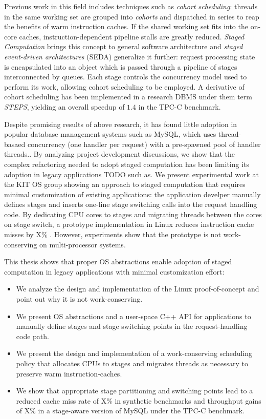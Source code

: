 \documentclass[12pt,a4paper]{book}
\begin{document}
Previous work in this field includes techniques such as \emph{cohort scheduling}:
threads in the same working set are grouped into \emph{cohorts} and dispatched in series to reap the benefits of warm instruction caches.
If the shared working set fits into the on-core caches, instruction-dependent pipeline stalls are greatly reduced.
\emph{Staged Computation} brings this concept to general software architecture and \emph{staged event-driven architectures} (SEDA) generalize it further:
request processing state is encapsulated into an object which is passed through a pipeline of stages interconnected by queues.
Each stage controls the concurrency model used to perform its work, allowing cohort scheduling to be employed.
A derivative of cohort scheduling has been implemented in a research DBMS under them term \emph{STEPS}, yielding an overall speedup of $1.4$ in the TPC-C benchmark.\cite{cohort,seda,steps,harizopoulos2005staged}

Despite promising results of above research, it has found little adoption in popular database management systems such as MySQL, which uses thread-basaed concurrency (one handler per request) with a pre-spawned pool of handler threads.\cite{mysqlThreading}.
By analyzing project development discussions, we show that the complex refactoring needed to adopt staged computation has been limiting its adoption in legacy applications TODO such as.
We present experimental work at the KIT OS group showing an approach to staged computation that requires minimal customization of existing applications:
the application develper manually defines stages and inserts one-line stage switching calls into the request handling code.
By dedicating CPU cores to stages and migrating threads between the cores on stage switch, a prototype implementation in Linux reduces instruction cache misses by X\% .
However, experiments show that the prototype is not work-conserving on multi-processor systems.

This thesis shows that proper OS abstractions enable adoption of staged computation in legacy applications with minimal customization effort:
\begin{itemize}
    \item We analyze the design and implementation of the Linux proof-of-concept and point out why it is not work-conserving.
    \item We present OS abstractions and a user-space C++ API for applications to manually define stages and stage switching points in the request-handling code path.
    \item We present the design and implementation of a work-conserving scheduling policy that allocates CPUs to stages and migrates threads as necessary to preserve warm instruction-caches.
    \item We show that appropriate stage partitioning and switching points lead to a reduced cache miss rate of X\% in synthetic benchmarks and throughput gains of X\% in a stage-aware version of MySQL under the TPC-C benchmark.
\end{itemize}
\end{document}
